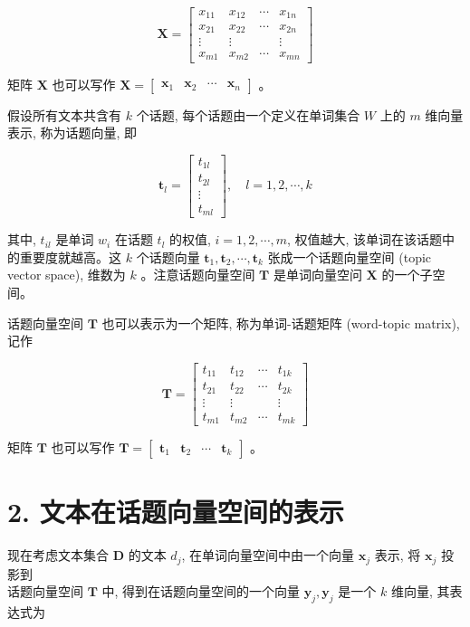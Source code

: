 \documentclass[10pt]{article}
\begin{document}
\[
\boldsymbol{X}=\left[\begin{array}{cccc}
x_{11} & x_{12} & \cdots & x_{1 n}  \tag{17.5}\\
x_{21} & x_{22} & \cdots & x_{2 n} \\
\vdots & \vdots & & \vdots \\
x_{m 1} & x_{m 2} & \cdots & x_{m n}
\end{array}\right]
\]

矩阵 $\boldsymbol{X}$ 也可以写作 $\boldsymbol{X}=\left[\begin{array}{llll}\boldsymbol{x}_{1} & \boldsymbol{x}_{2} & \cdots & \boldsymbol{x}_{n}\end{array}\right]$ 。

假设所有文本共含有 $k$ 个话题, 每个话题由一个定义在单词集合 $W$ 上的 $m$ 维向量表示, 称为话题向量, 即

\[
\boldsymbol{t}_{l}=\left[\begin{array}{c}
t_{1 l}  \tag{17.6}\\
t_{2 l} \\
\vdots \\
t_{m l}
\end{array}\right], \quad l=1,2, \cdots, k
\]

其中, $t_{i l}$ 是单词 $w_{i}$ 在话题 $t_{l}$ 的权值, $i=1,2, \cdots, m$, 权值越大, 该单词在该话题中的重要度就越高。这 $k$ 个话题向量 $\boldsymbol{t}_{1}, \boldsymbol{t}_{2}, \cdots, \boldsymbol{t}_{k}$ 张成一个话题向量空间 (topic vector space), 维数为 $k$ 。注意话题向量空间 $\boldsymbol{T}$ 是单词向量空问 $\boldsymbol{X}$ 的一个子空间。

话题向量空间 $\boldsymbol{T}$ 也可以表示为一个矩阵, 称为单词-话题矩阵 (word-topic matrix), 记作

\[
\boldsymbol{T}=\left[\begin{array}{cccc}
t_{11} & t_{12} & \cdots & t_{1 k}  \tag{17.7}\\
t_{21} & t_{22} & \cdots & t_{2 k} \\
\vdots & \vdots & & \vdots \\
t_{m 1} & t_{m 2} & \cdots & t_{m k}
\end{array}\right]
\]

矩阵 $\boldsymbol{T}$ 也可以写作 $\boldsymbol{T}=\left[\begin{array}{llll}\boldsymbol{t}_{1} & \boldsymbol{t}_{2} & \cdots & \boldsymbol{t}_{k}\end{array}\right]$ 。

\section*{2. 文本在话题向量空间的表示}
现在考虑文本集合 $\boldsymbol{D}$ 的文本 $d_{j}$, 在单词向量空间中由一个向量 $\boldsymbol{x}_{j}$ 表示, 将 $\boldsymbol{x}_{j}$ 投影到\\
话题向量空间 $\boldsymbol{T}$ 中, 得到在话题向量空间的一个向量 $\boldsymbol{y}_{j}, \boldsymbol{y}_{j}$ 是一个 $k$ 维向量, 其表达式为
\end{document}
